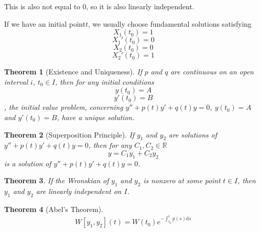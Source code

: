 \documentclass[11pt]{article}
\theoremstyle{plain} %
\newtheorem*{theorem}{Theorem}
\theoremstyle{definition}
\theoremstyle{example}
\theoremstyle{remark}
\begin{document}
This is also not equal to $0$, so it is also linearly independent. 

If we have an initial point$t$, we usually choose fundamental solutions satisfying
 $$X_1(t_0) = 1$$
$$ X_1'(t_0) = 0$$ 
$$ X_2(t_0) = 0$$
$$X_2'(t_0) = 1$$

\begin{theorem}[Existence and Uniqueness]
If $p$ and $q$ are continuous on an open interval $i$, $t_0 \in I$, then for any initial conditions
$$y(t_0) = A$$
$$y'(t_0) = B$$
, the initial value problem, concerning $y'' + p(t) y' + q(t)y = 0$, $y(t_0) = A$ and 
$y'(t_0) = B$, have a unique solution.
\end{theorem}

\begin{theorem}[Superposition Principle]
If $y_1$ and $y_2$ are solutions of $y'' + p(t) y' + q(t)y = 0$, then for any $C_1, C_2 \in \mathbb R$
$$y=C_1y_1 + C_2y_2$$
is a solution of $y'' + p(t) y' + q(t)y = 0$.
\end{theorem}

\begin{theorem}
If the Wronskian of $y_1$ and $y_2$ is nonzero at some point $t \in I$, then $y_1$ and $y_2$ are linearly independent on $I$. 
\end{theorem}

\begin{theorem}[Abel's Theorem]
$$W[y_1, y_2](t) = W(t_0)e^{-\int_{t_0}^tp(s) \mathrm d s}$$
\end{theorem}
\end{document}
